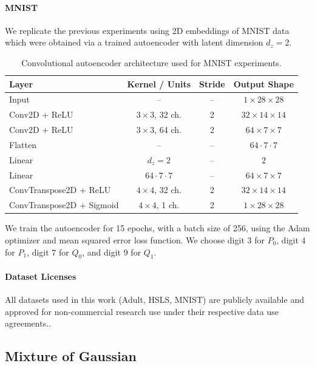 \documentclass[11pt,letterpaper]{article}
\begin{document}
\paragraph{MNIST}

We replicate the previous experiments using 2D embeddings of MNIST data which were obtained via a trained autoencoder with latent dimension $d_z=2$. 

\begin{table}[h]
\centering
\caption{Convolutional autoencoder architecture used for MNIST experiments.}
\begin{tabular}{lccc}
\toprule
Layer & Kernel / Units & Stride & Output Shape \\
\midrule
Input & -- & -- & $1 \times 28 \times 28$ \\
Conv2D + ReLU & $3\times3$, 32 ch. & 2 & $32 \times 14 \times 14$ \\
Conv2D + ReLU & $3\times3$, 64 ch. & 2 & $64 \times 7 \times 7$ \\
Flatten & -- & -- & $64\cdot7\cdot7$ \\
Linear & $d_z=2$ & -- & $2$ \\
\midrule
Linear & $64\cdot7\cdot7$ & -- & $64 \times 7 \times 7$ \\
ConvTranspose2D + ReLU & $4\times4$, 32 ch. & 2 & $32 \times 14 \times 14$ \\
ConvTranspose2D + Sigmoid & $4\times4$, 1 ch. & 2 & $1 \times 28 \times 28$ \\
\bottomrule
\end{tabular}
\end{table}


We train the autoencoder for 15 epochs, with a batch size of 256, using the Adam optimizer and mean squared error loss function. We choose digit $3$ for $P_0$, digit $4$ for $P_1$, digit $7$ for $Q_0$, and digit $9$ for $Q_1$. 

\paragraph{Dataset Licenses} All datasets used in this work (Adult, HSLS, MNIST) are publicly available and approved for non-commercial research use under their respective data use agreements.. 



\subsection{Mixture of Gaussian}
\end{document}
